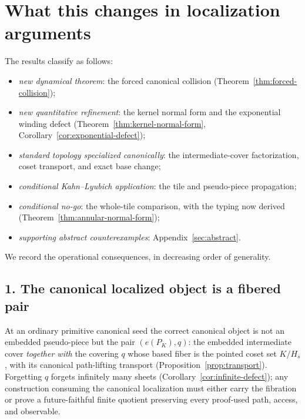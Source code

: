 \documentclass[11pt,reqno]{amsart}
\theoremstyle{definition}
\theoremstyle{remark}
\begin{document}
\section{What this changes in localization arguments}
\label{sec:changes}

The results classify as follows:
\begin{itemize}
\item \emph{new dynamical theorem}: the forced canonical collision
  (Theorem~\ref{thm:forced-collision});
\item \emph{new quantitative refinement}: the kernel normal form and
  the exponential winding defect
  (Theorem~\ref{thm:kernel-normal-form},
  Corollary~\ref{cor:exponential-defect});
\item \emph{standard topology specialized canonically}: the
  intermediate-cover factorization, coset transport, and exact base
  change;
\item \emph{conditional Kahn--Lyubich application}: the tile and
  pseudo-piece propagation;
\item \emph{conditional no-go}: the whole-tile comparison, with the
  typing now derived (Theorem~\ref{thm:annular-normal-form});
\item \emph{supporting abstract counterexamples}:
  Appendix~\ref{sec:abstract}.
\end{itemize}

We record the operational consequences, in decreasing order of
generality.

\subsection*{1. The canonical localized object is a fibered pair}
At an ordinary primitive canonical seed the correct canonical object is
not an embedded pseudo-piece but the pair $(e(P_{K}),q)$: the embedded
intermediate cover \emph{together with} the covering $q$ whose based
fiber is the pointed coset set $K/H_{s}$, with its canonical
path-lifting transport (Proposition~\ref{prop:transport}).  Forgetting
$q$ forgets infinitely many sheets
(Corollary~\ref{cor:infinite-defect}); any construction consuming the
canonical localization must either carry the fibration or prove a
future-faithful finite quotient preserving every proof-used path,
access, and observable.
\end{document}
